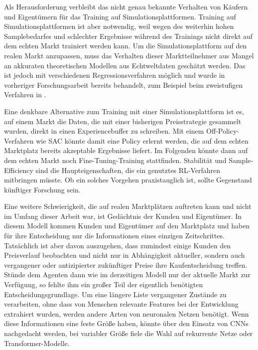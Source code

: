 Als Herausforderung verbleibt das nicht genau bekannte Verhalten von Käufern und Eigentümern für das Training auf Simulationsplattformen.
Training auf Simulationsplattformen ist aber notwendig, weil wegen des weiterhin hohen Samplebedarfes und schlechter Ergebnisse während des Trainings nicht direkt auf dem echten Markt trainiert werden kann.
Um die Simulationsplattform auf den realen Markt anzupassen, muss das Verhalten dieser Marktteilnehmer aus Mangel an akkuraten theoretischen Modellen aus Echtweltdaten geschätzt werden.
Das ist jedoch mit verschiedenen Regressionsverfahren möglich und wurde in vorheriger Forschungsarbeit bereits behandelt, zum Beispiel beim zweistufigen Verfahren in \cite{10.1145/3219819.3219833}.

Eine denkbare Alternative zum Training mit einer Simulationsplattform ist es, auf einem Markt die Daten, die mit einer bisherigen Preisstrategie gesammelt wurden, direkt in einen Experiencebuffer zu schreiben.
Mit einem Off-Policy-Verfahren wie SAC könnte damit eine Policy erlernt werden, die auf dem echten Marktplatz bereits akzeptable Ergebnisse liefert.
Im Folgenden könnte dann auf dem echten Markt noch Fine-Tuning-Training stattfinden.
Stabilität und Sample-Efficiency sind die Haupteigenschaften, die ein genutztes RL-Verfahren mitbringen müsste.
Ob ein solches Vorgehen praxistauglich ist, sollte Gegenstand künftiger Forschung sein.

Eine weitere Schwierigkeit, die auf realen Marktplätzen auftreten kann und nicht im Umfang dieser Arbeit war, ist Gedächtnis der Kunden und Eigentümer.
In diesem Modell kommen Kunden und Eigentümer auf den Marktplatz und haben für ihre Entscheidung nur die Informationen eines einzigen Zeitschrittes.
Tatsächlich ist aber davon auszugehen, dass zumindest einige Kunden den Preisverlauf beobachten und nicht nur in Abhängigkeit aktueller, sondern auch vergangener oder antizipierter zukünftiger Preise ihre Kaufentscheidung treffen.
Stünde dem Agenten dann wie im derzeitigen Modell nur der aktuelle Markt zur Verfügung, so fehlte ihm ein großer Teil der eigentlich benötigten Entscheidungsgrundlage.
Um eine längere Liste vergangener Zustände zu verarbeiten, ohne dass von Menschen relevante Features bei der Entwicklung extrahiert wurden, werden andere Arten von neuronalen Netzen benötigt.
Wenn diese Informationen eine feste Größe haben, könnte über den Einsatz von CNNs nachgedacht werden, bei variabler Größe fiele die Wahl auf rekurrente Netze oder Transformer-Modelle.